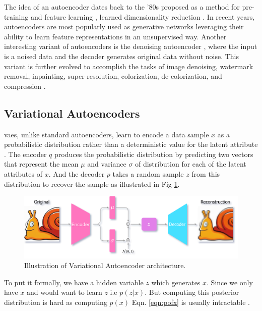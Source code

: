 The idea of an autoencoder dates back to the '80s proposed as a method for pre-training and feature learning \cite{ballard1987modular, rumelhart1985learning}, learned dimensionality reduction \cite{hinton_dimentionality}. In recent years, autoencoders are most popularly used as generative networks leveraging their ability to learn feature representations in an unsupervised way. Another interesting variant of autoencoders is the denoising autoencoder \cite{vincent2008extracting}, where the input is a noised data and the decoder generates original data without noise. This variant is further evolved to accomplish the tasks of image denoising, watermark removal, inpainting, super-resolution, colorization, de-colorization, and compression \cite{zhang2016colorful, imagedenoisingpaper,deepimageprior}. 

\subsection{Variational Autoencoders}
\label{subsec:vae}
\acp{vae}, unlike standard autoencoders, learn to encode a data sample $x$ as a probabilistic distribution rather than a deterministic value for the latent attribute \cite{jeremy_jordan_2018}. The encoder $q$ produces the probabilistic distribution by predicting two vectors that represent the mean $\mu$ and variance $\sigma$ of distribution for each of the latent attributes of $x$. And the decoder $p$ takes a random sample $z$ from this distribution to recover the sample as illustrated in Fig \ref{fig:vae_arch}.

\begin{figure}[h]
    \centering
    \includegraphics[scale=0.2]{figures/arch/vae_arch.png}
    \caption{Illustration of Variational Autoencoder architecture.}
    \label{fig:vae_arch}
\end{figure}

To put it formally, we have a hidden variable $z$ which generates $x$. Since we only have $x$ and would want to learn $z$ i.e $p(z | x)$. But computing this posterior distribution is hard as computing $p(x)$ Eqn. \ref{eqn:pofx} is usually intractable \cite{kingma2013autoencoding}.

